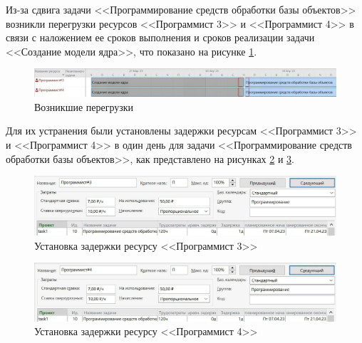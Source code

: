 Из-за сдвига задачи <<Программирование средств обработки базы объектов>> возникли перегрузки ресурсов <<Программист 3>> и <<Программист 4>> в связи с наложением ее сроков выполнения и сроков реализации задачи <<Создание модели ядра>>, что показано на рисунке \ref{img:task2-overloads}.

\begin{figure}[H]
	\begin{center}
		\includegraphics[scale=0.3]{inc/img/task2-overloads.jpg}
	\end{center}
	\captionsetup{justification=centering}
	\caption{Возникшие перегрузки}
	\label{img:task2-overloads}
\end{figure}

Для их устранения были установлены задержки ресурсам <<Программист 3>> и <<Программист 4>> в один день для задачи <<Программирование средств обработки базы объектов>>, как представлено на рисунках \ref{img:task2-overloads-fix1} и \ref{img:task2-overloads-fix2}.

\begin{figure}[H]
	\begin{center}
		\includegraphics[scale=0.3]{inc/img/task2-fix-overloads1.jpg}
	\end{center}
	\captionsetup{justification=centering}
	\caption{Установка задержки ресурсу <<Программист 3>>}
	\label{img:task2-overloads-fix1}
\end{figure}

\begin{figure}[H]
	\begin{center}
		\includegraphics[scale=0.3]{inc/img/task2-fix-overloads2.jpg}
	\end{center}
	\captionsetup{justification=centering}
	\caption{Установка задержки ресурсу <<Программист 4>>}
	\label{img:task2-overloads-fix2}
\end{figure}

